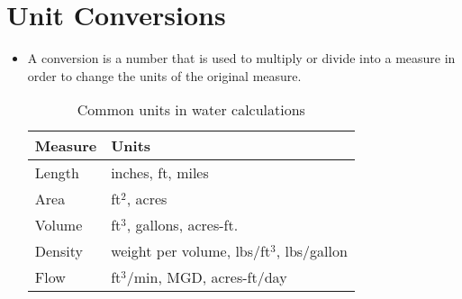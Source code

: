 \section{Unit Conversions}
\begin{itemize}
\item A conversion is a number that is used to multiply or divide into a measure in order to change the units of the original measure.

\begin{table}[h!]

\begin{center}
    \begin{tabular}{ | p{4cm} |p{8cm}|}
    \hline
    
\textbf{Measure} & \textbf{Units}\\
\hline   
Length  & inches, ft, miles\\
\hline 
Area  & ft$^2$, acres \\
\hline 
Volume & ft$^3$, gallons, acres-ft.\\
\hline 
Density & weight per volume, lbs/ft$^3$, lbs/gallon\\
\hline 
Flow & ft$^3$/min, MGD, acres-ft/day\\
\hline 

	

    \end{tabular}
 \caption{Common units in water calculations}	
    \end{center}

    \end{table}


\end{itemize}
